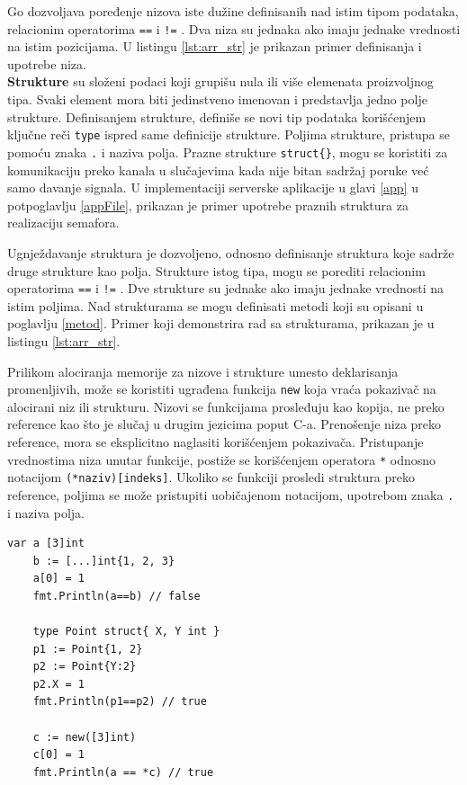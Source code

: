 \documentclass[12pt,oneside]{memoir}
\begin{document}
Go dozvoljava poređenje nizova iste dužine definisanih nad istim tipom podataka, relacionim operatorima \texttt{==} i \texttt{!=} . Dva niza su jednaka ako imaju jednake vrednosti na istim pozicijama. U listingu \ref{lst:arr_str} je prikazan primer definisanja i upotrebe niza.
\\

\textbf{Strukture} su složeni podaci koji grupišu nula ili više elemenata proizvoljnog tipa. Svaki element mora biti jedinstveno imenovan i predstavlja jedno polje strukture. Definisanjem strukture, definiše se novi tip podataka korišćenjem ključne reči \texttt{type} ispred same definicije strukture. Poljima strukture, pristupa se pomoću znaka \texttt{.} i naziva polja. Prazne strukture \texttt{struct\{\}}, mogu se koristiti za komunikaciju preko kanala u slučajevima kada nije bitan sadržaj poruke već samo davanje signala. U implementaciji serverske aplikacije u glavi \ref{app} u potpoglavlju \ref{appFile}, prikazan je primer upotrebe praznih struktura za realizaciju semafora. 

Ugnježdavanje struktura je dozvoljeno, odnosno definisanje struktura koje sadrže druge strukture kao polja. Strukture istog tipa, mogu se porediti relacionim operatorima   \texttt{==} i \texttt{!=} . Dve strukture su jednake ako imaju jednake vrednosti na istim poljima. Nad strukturama se mogu definisati metodi koji su opisani u poglavlju \ref{metod}. Primer koji demonstrira rad sa strukturama, prikazan je u listingu  \ref{lst:arr_str}.

Prilikom alociranja memorije za nizove i strukture umesto deklarisanja promenljivih, može se koristiti ugrađena funkcija \texttt{new} koja vraća pokazivač na alocirani niz ili strukturu. Nizovi se funkcijama prosleđuju kao kopija, ne preko reference kao što je slučaj u drugim jezicima poput C-a. Prenošenje niza preko reference, mora se eksplicitno naglasiti korišćenjem pokazivača. Pristupanje vrednostima niza unutar funkcije, postiže se korišćenjem operatora \texttt{*} odnosno notacijom \texttt{(*naziv)[indeks]}. Ukoliko se funkciji prosledi struktura preko reference, poljima se može pristupiti uobičajenom notacijom, upotrebom znaka \texttt{.} i naziva polja.


\begin{center}
\begin{lstlisting}[caption=Primer koji demonstrira rad sa nizovima i strukturama, label={lst:arr_str},  backgroundcolor=\color{background}]
	var a [3]int
	b := [...]int{1, 2, 3}
	a[0] = 1
	fmt.Println(a==b) // false

	type Point struct{ X, Y int }
	p1 := Point{1, 2}
	p2 := Point{Y:2}
	p2.X = 1
	fmt.Println(p1==p2) // true

	c := new([3]int)
	c[0] = 1
	fmt.Println(a == *c) // true			
\end{lstlisting}
\end{center}
\end{document}
